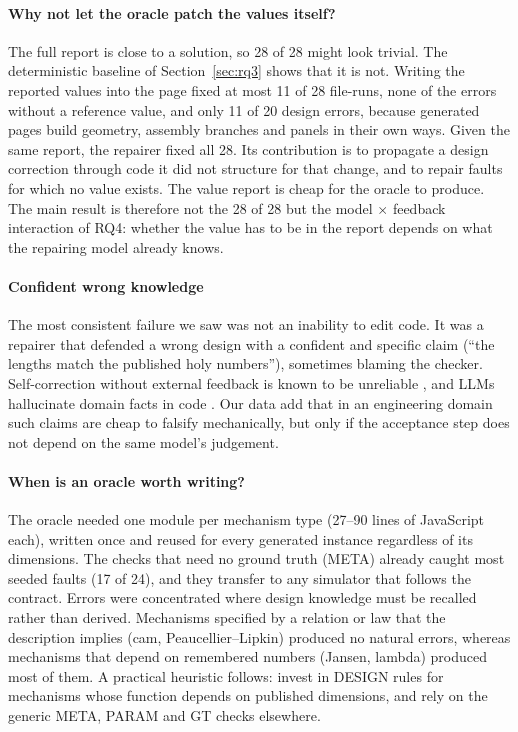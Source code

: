 \paragraph{Why not let the oracle patch the values itself?} The full report is close to a solution, so 28 of 28 might look trivial. The deterministic baseline of Section~\ref{sec:rq3} shows that it is not. Writing the reported values into the page fixed at most 11 of 28 file-runs, none of the errors without a reference value, and only 11 of 20 design errors, because generated pages build geometry, assembly branches and panels in their own ways. Given the same report, the repairer fixed all 28. Its contribution is to propagate a design correction through code it did not structure for that change, and to repair faults for which no value exists. The value report is cheap for the oracle to produce. The main result is therefore not the 28 of 28 but the model $\times$ feedback interaction of RQ4: whether the value has to be in the report depends on what the repairing model already knows.

\paragraph{Confident wrong knowledge} The most consistent failure we saw was not an inability to edit code. It was a repairer that defended a wrong design with a confident and specific claim (``the lengths match the published holy numbers''), sometimes blaming the checker. Self-correction without external feedback is known to be unreliable \citep{huang2024cannot,kamoi2024selfcorrection}, and LLMs hallucinate domain facts in code \citep{liu2026codehallucination,tian2025codehalu}. Our data add that in an engineering domain such claims are cheap to falsify mechanically, but only if the acceptance step does not depend on the same model's judgement.

\paragraph{When is an oracle worth writing?} The oracle needed one module per mechanism type (27--90 lines of JavaScript each), written once and reused for every generated instance regardless of its dimensions. The checks that need no ground truth (META) already caught most seeded faults (17 of 24), and they transfer to any simulator that follows the contract. Errors were concentrated where design knowledge must be recalled rather than derived. Mechanisms specified by a relation or law that the description implies (cam, Peaucellier--Lipkin) produced no natural errors, whereas mechanisms that depend on remembered numbers (Jansen, lambda) produced most of them. A practical heuristic follows: invest in DESIGN rules for mechanisms whose function depends on published dimensions, and rely on the generic META, PARAM and GT checks elsewhere.

